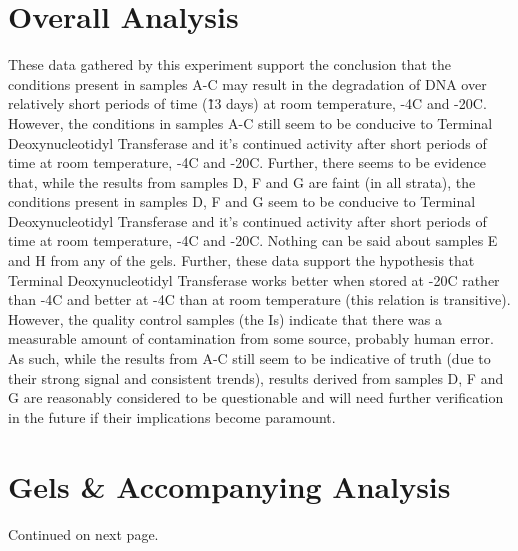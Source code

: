 \documentclass[a4paper]{article}
\newcommand{\tdt}{Terminal Deoxynucleotidyl Transferase}
\newcommand{\C}{\degree C}
\begin{document}
\section{Overall Analysis}

These data gathered by this experiment support the conclusion that the conditions present in samples A-C may result in the degradation of DNA over relatively short periods of time (\~13 days) at room temperature, -4\C{} and -20\C{}. However, the conditions in samples A-C still seem to be conducive to \tdt{} and it's continued activity after short periods of time at room temperature, -4\C{} and -20\C{}. Further, there seems to be evidence that, while the results from samples D, F and G are faint (in all strata), the conditions present in samples D, F and G seem to be conducive to \tdt{} and it's continued activity after short periods of time at room temperature, -4\C{} and -20\C{}. Nothing can be said about samples E and H from any of the gels. Further, these data support the hypothesis that \tdt{} works better when stored at -20\C{} rather than -4\C{} and better at -4\C{} than at room temperature (this relation is transitive). However, the quality control samples (the Is) indicate that there was a measurable amount of contamination from some source, probably human error. As such, while the results from A-C still seem to be indicative of truth (due to their strong signal and consistent trends), results derived from samples D, F and G are reasonably considered to be questionable and will need further verification in the future if their implications become paramount.

\section{Gels \& Accompanying Analysis}
\label{sec:gelAnalysis}
Continued on next page.
\end{document}
